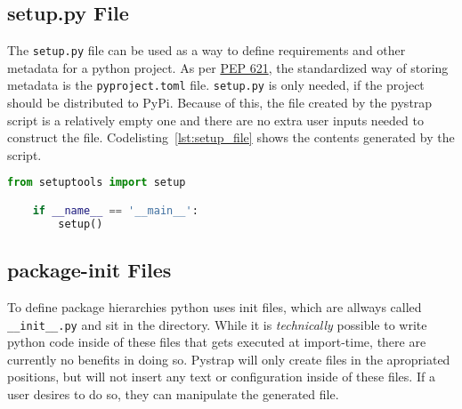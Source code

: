\documentclass[a4paper, 12pt]{scrartcl}
\begin{document}
\newpage

\subsection{setup.py File}
The \texttt{setup.py} file can be used as a way to define requirements and
other metadata for a python project. As per
\href{https://peps.python.org/pep-0621/}{PEP 621}, the standardized way of
storing metadata is the \texttt{pyproject.toml} file. \texttt{setup.py} is only
needed, if the project should be distributed to PyPi. Because of this, the file
created by the pystrap script is a relatively empty one and there are no extra
user inputs needed to construct the file. Codelisting~\ref{lst:setup_file}
shows the contents generated by the script.

\begin{lstlisting}[language=Python, caption={The setup.py file}, label={lst:setup_file}]
    from setuptools import setup

    if __name__ == '__main__':
        setup()
\end{lstlisting}

\subsection{package-init Files}
To define package hierarchies python uses init files, which are allways called \\
\verb|__init__.py| and sit in the directory. While it is \emph{technically}
possible to write python code inside of these files that gets executed at
import-time, there are currently no benefits in doing so. Pystrap will only
create files in the apropriated positions, but will not insert any text or
configuration inside of these files. If a user desires to do so, they can
manipulate the generated file.
\end{document}
